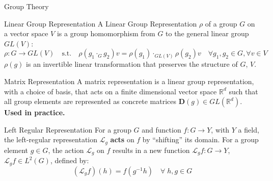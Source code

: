 \documentclass[9pt,dvipsnames]{beamer}
\begin{document}
\begin{frame}{Group Theory}
	\begin{block}{Linear Group Representation}
		A Linear Group Representation $\rho$ of a group $G$ on a vector space $V$ is a group homomorphism from $G$ to the general linear group $GL(V)$:
		\begin{equation*}
			\rho : G \to GL(V) \quad \text{s.t.} \quad \rho(g_1 \cdot_{G} g_2)v = \rho(g_1) \cdot_{GL(V)}\rho(g_2)v \quad \forall g_1, g_2 \in G, \forall v \in V
		\end{equation*}
		$\rho(g)$ is an invertible linear transformation that preserves the structure of $G$, $V$.
	\end{block}

	\begin{block}{Matrix Representation}
		A matrix representation is a linear group representation, with a choice of basis, that acts on a finite dimensional vector space $\mathbb{R}^d$ such that all group elements are represented as concrete matrices $\mathbf{D}(g) \in GL(\mathbb{R}^d)$. {\color{red} \textbf{Used in practice.}}
	\end{block}

	\begin{block}{Left Regular Representation}
		For a group $G$ and function $f : G \to Y$, with $Y$ a field, the left-regular representation $\mathscr{L}_g$ \textbf{acts} on $f$ by ``shifting'' its domain. For a group element $g \in G$, the action $\mathscr{L}_g$ on $f$ results in a new function $\mathscr{L}_g f : G \to Y$, $\mathscr{L}_g f \in L^2(G)$, defined by:
		\begin{equation*}
			(\mathscr{L}_g f)(h) = f(g^{-1}h) \quad \forall \; h, g \in G
		\end{equation*}
	\end{block}

\end{frame}
\end{document}
